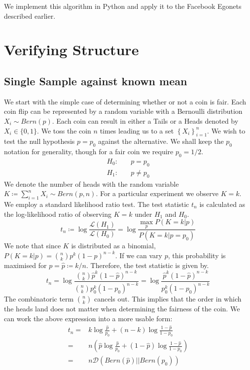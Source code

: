 \documentclass[]{article}
\newcommand{\lik}{\mathcal{L}}
\newcommand{\kl}{\mathcal{D}}
\begin{document}
We implement this algorithm in Python and apply it to the Facebook Egonets described earlier. 

\section{Verifying Structure}
\subsection{Single Sample against known mean}
We start with the simple case of determining whether or not a coin is fair. Each coin flip can be represented by a random variable with a Bernoulli distribution $X_i \sim Bern(p)$. Each coin can result in either a Tails or a Heads denoted by $X_i \in \{0, 1\}$. We toss the coin $n$ times leading us to a set $\left\{ X_i \right\}_{i=1}^{n}$. We wish to test the null hypothesis $p=p_0$ against the alternative. We shall keep the $p_0$ notation for generality, though for a fair coin we require $p_0=1/2$.
%
\begin{align*}
H_0:& \quad p = p_0 \\
H_1:& \quad p \neq p_0
\end{align*}
%
We denote the number of heads with the random variable $K \coloneqq \sum_{i=1}^{n} X_i \sim Bern(p, n)$. For a particular experiment we observe $K=k$. We employ a standard likelihood ratio test. The test statistic $t_n$ is calculated as the log-likelihood ratio of observing $K=k$ under $H_1$ and $H_0$.
%
\begin{equation}
t_n \coloneqq \log \frac{\lik(H_1)}{\lik(H_0)}
= \log \frac{\max_p P(K=k|p)}{P(K=k|p=p_0)}
\end{equation} 
%
We note that since $K$ is distributed as a binomial, $P(K=k|p)=\binom{n}{k}p^k(1-p)^{n-k}$. If we can vary $p$, this probability is maximised for $p=\hat{p} \coloneqq k/n$. Therefore, the test statistic is given by.
%
\begin{equation}
t_n = \log \frac{\binom{n}{k} \hat{p}^k (1 - \hat{p})^{n-k}}{\binom{n}{k} p_0^k (1 - p_0)^{n-k}}
=  \log \frac{ \hat{p}^k (1 - \hat{p})^{n-k}}{ p_0^k (1 - p_0)^{n-k}}
\end{equation}
%
The combinatoric term $\binom{n}{k}$ cancels out. This implies that the order in which the heads land does not matter when determining the fairness of the coin. We can work the above expression into a more usable form:
%
\begin{align}
t_n =& k \log \frac{\hat{p}}{p_0} + (n-k) \log \frac{1 - \hat{p}}{1 - p_0} \nonumber \\
=& n \left( \hat{p} \log \frac{\hat{p}}{p_0} + (1-\hat{p}) \log \frac{1 - \hat{p}}{1-p_0} \right) \nonumber \\
=& n \kl \left(Bern(\hat{p}) || Bern(p_0) \right)
\end{align}
\end{document}
